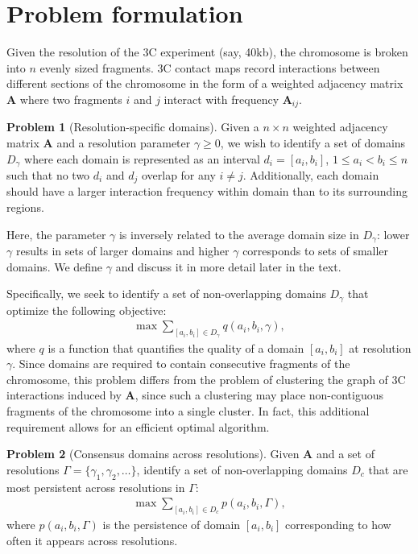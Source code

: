 \documentclass[12pt]{cmuthesis}
\begin{document}
%
%
\section{Problem formulation}


  \theoremstyle{definition}
  \newtheorem{prob}{Problem}

  Given the resolution of the 3C experiment (say, 40kb), the chromosome is broken into $n$ evenly sized fragments. 3C contact maps record interactions between different sections of the chromosome in the form of a weighted adjacency matrix $\mathbf{A}$ where two fragments $i$ and $j$ interact with frequency $\mathbf{A}_{ij}$.

  \begin{prob}[Resolution-specific domains] \label{domainprob} Given a $n \times n$ weighted adjacency matrix $\mathbf{A}$ and a resolution parameter $\gamma \geq 0$, we wish to identify a set of domains $D_{\gamma}$ where each domain is represented as an interval $d_i=[a_i, b_i]$, $1 \leq a_i < b_i \leq n$ such that no two $d_i$ and $d_j$ overlap for any $i \ne j$. Additionally, each domain should have a larger interaction frequency within domain than to its surrounding regions.

  Here, the parameter $\gamma$ is inversely related to the average domain size in $D_{\gamma}$: lower $\gamma$ results in sets of larger domains and higher $\gamma$ corresponds to sets of smaller domains. We define $\gamma$ and discuss it in more detail later in the text.

  Specifically, we seek to identify a set of non-overlapping domains $D_{\gamma}$ that optimize the following objective:
  \begin{align}
    \label{obj}
    \max \sum_{[a_i,b_i] \in D_{\gamma}} q(a_i,b_i,\gamma),
  \end{align}
  where $q$ is a function that quantifies the quality of a domain $[a_i, b_i]$ at resolution $\gamma$. Since domains are required to contain consecutive fragments of the chromosome, this problem differs from the problem of clustering the graph of 3C interactions induced by $\mathbf{A}$, since such a clustering may place non-contiguous fragments of the chromosome into a single cluster. In fact, this additional requirement allows for an efficient optimal algorithm.
  \end{prob}

  \begin{prob}[Consensus domains across resolutions]
  \label{consensusprob}  Given $\mathbf{A}$ and a
  set of resolutions $\Gamma = \{\gamma_1, \gamma_2, \ldots \}$, identify a set of non-overlapping domains $D_c$ that are most persistent across resolutions in $\Gamma$:
  \begin{align}
  \label{consobj}
  \max \sum_{[a_i,b_i] \in D_c} p(a_i,b_i,\Gamma),
  \end{align}
  where $p(a_i,b_i,\Gamma)$ is the persistence of domain $[a_i, b_i]$ corresponding to how often it appears across resolutions.
  \end{prob}
\end{document}
